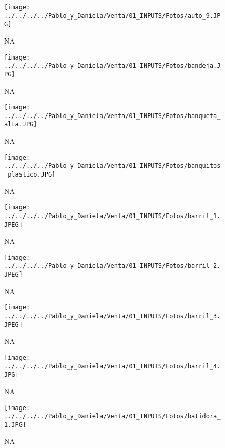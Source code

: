 \documentclass[
]{article}
\begin{document}
\pagebreak

\begin{figure}
\centering
\texttt{[image: ../../../../Pablo\_y\_Daniela/Venta/01\_INPUTS/Fotos/auto\_9.JPG]}
\caption{NA}
\end{figure}

\pagebreak

\begin{figure}
\centering
\texttt{[image: ../../../../Pablo\_y\_Daniela/Venta/01\_INPUTS/Fotos/bandeja.JPG]}
\caption{NA}
\end{figure}

\pagebreak

\begin{figure}
\centering
\texttt{[image: ../../../../Pablo\_y\_Daniela/Venta/01\_INPUTS/Fotos/banqueta\_alta.JPG]}
\caption{NA}
\end{figure}

\pagebreak

\begin{figure}
\centering
\texttt{[image: ../../../../Pablo\_y\_Daniela/Venta/01\_INPUTS/Fotos/banquitos\_plastico.JPG]}
\caption{NA}
\end{figure}

\pagebreak

\begin{figure}
\centering
\texttt{[image: ../../../../Pablo\_y\_Daniela/Venta/01\_INPUTS/Fotos/barril\_1.JPEG]}
\caption{NA}
\end{figure}

\pagebreak

\begin{figure}
\centering
\texttt{[image: ../../../../Pablo\_y\_Daniela/Venta/01\_INPUTS/Fotos/barril\_2.JPEG]}
\caption{NA}
\end{figure}

\pagebreak

\begin{figure}
\centering
\texttt{[image: ../../../../Pablo\_y\_Daniela/Venta/01\_INPUTS/Fotos/barril\_3.JPEG]}
\caption{NA}
\end{figure}

\pagebreak

\begin{figure}
\centering
\texttt{[image: ../../../../Pablo\_y\_Daniela/Venta/01\_INPUTS/Fotos/barril\_4.JPG]}
\caption{NA}
\end{figure}

\pagebreak

\begin{figure}
\centering
\texttt{[image: ../../../../Pablo\_y\_Daniela/Venta/01\_INPUTS/Fotos/batidora\_1.JPG]}
\caption{NA}
\end{figure}
\end{document}
